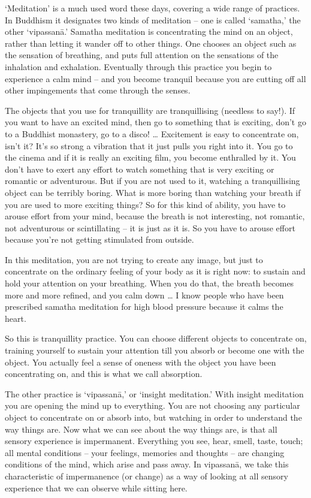 
`Meditation' is a much used word these days, covering a wide range of practices. In Buddhism it designates two kinds of meditation -- one is called `samatha,' the other `vipassanā.' Samatha meditation is concentrating the mind on an object, rather than letting it wander off to other things. One chooses an object such as the sensation of breathing, and puts full attention on the sensations of the inhalation and exhalation. Eventually through this practice you begin to experience a calm mind -- and you become tranquil because you are cutting off all other impingements that come through the senses.

The objects that you use for tranquillity are tranquillising (needless to say!). If you want to have an excited mind, then go to something that is exciting, don't go to a Buddhist monastery, go to a disco! \ldots{} Excitement is easy to concentrate on, isn't it? It's so strong a vibration that it just pulls you right into it. You go to the cinema and if it is really an exciting film, you become enthralled by it. You don't have to exert any effort to watch something that is very exciting or romantic or adventurous. But if you are not used to it, watching a tranquillising object can be terribly boring. What is more boring than watching your breath if you are used to more exciting things? So for this kind of ability, you have to arouse effort from your mind, because the breath is not interesting, not romantic, not adventurous or scintillating -- it is just as it is. So you have to arouse effort because you're not getting stimulated from outside.

In this meditation, you are not trying to create any image, but just to concentrate on the ordinary feeling of your body as it is right now: to sustain and hold your attention on your breathing. When you do that, the breath becomes more and more refined, and you calm down \ldots{} I know people who have been prescribed samatha meditation for high blood pressure because it calms the heart.

So this is tranquillity practice. You can choose different objects to concentrate on, training yourself to sustain your attention till you absorb or become one with the object. You actually feel a sense of oneness with the object you have been concentrating on, and this is what we call absorption.

The other practice is `vipassanā,' or `insight meditation.' With insight meditation you are opening the mind up to everything. You are not choosing any particular object to concentrate on or absorb into, but watching in order to understand the way things are. Now what we can see about the way things are, is that all sensory experience is impermanent. Everything you see, hear, smell, taste, touch; all mental conditions -- your feelings, memories and thoughts -- are changing conditions of the mind, which arise and pass away. In vipassanā, we take this characteristic of impermanence (or change) as a way of looking at all sensory experience that we can observe while sitting here.

